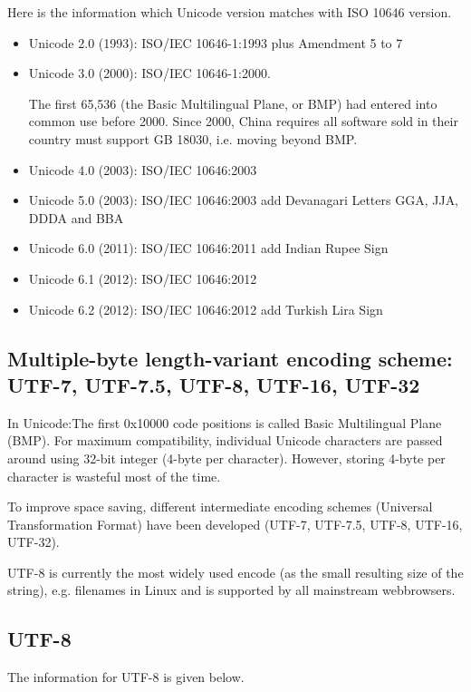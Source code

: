 Here is the information which Unicode version matches with ISO 10646 version.
\begin{itemize}
  \item Unicode 2.0 (1993): ISO/IEC 10646-1:1993 plus Amendment 5 to 7
  \item Unicode 3.0 (2000): ISO/IEC 10646-1:2000. 
  
The first 65,536 (the Basic Multilingual Plane, or BMP) had entered into common
use before 2000.  Since 2000, China requires all software sold in their country
must support GB 18030, i.e. moving beyond BMP.
    
  \item Unicode 4.0 (2003): ISO/IEC 10646:2003 
  
  \item Unicode 5.0 (2003): ISO/IEC 10646:2003 add Devanagari Letters GGA, JJA,
  DDDA and BBA
  
  \item Unicode 6.0 (2011): ISO/IEC 10646:2011 add Indian Rupee Sign
  \item Unicode 6.1 (2012): ISO/IEC 10646:2012
  \item Unicode 6.2 (2012): ISO/IEC 10646:2012 add Turkish Lira Sign
\end{itemize}

\subsection{Multiple-byte length-variant encoding scheme: UTF-7,
UTF-7.5, UTF-8, UTF-16, UTF-32}

In Unicode:The first 0x10000 code positions is called Basic Multilingual Plane
(BMP). For maximum compatibility, individual Unicode characters are passed
around using 32-bit integer (4-byte per character). However, storing 4-byte per
character is wasteful most of the time.

To improve space saving, different intermediate encoding schemes (Universal
Transformation Format) have been developed (UTF-7, UTF-7.5, UTF-8, UTF-16,
UTF-32). 

UTF-8 is currently the most widely used encode (as the small resulting size of
the string), e.g. filenames in Linux and is supported by all mainstream
webbrowsers. 

\subsection{UTF-8}

The information for UTF-8 is given below.

